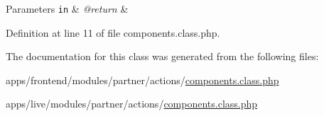 \begin{DoxyParams}[1]{Parameters}
\mbox{\tt in}  & {\em @return} & \\
\hline
\end{DoxyParams}


Definition at line 11 of file components.\-class.\-php.



The documentation for this class was generated from the following files\-:\begin{DoxyCompactItemize}
\item 
apps/frontend/modules/partner/actions/\hyperlink{frontend_2modules_2partner_2actions_2components_8class_8php}{components.\-class.\-php}\item 
apps/live/modules/partner/actions/\hyperlink{live_2modules_2partner_2actions_2components_8class_8php}{components.\-class.\-php}\end{DoxyCompactItemize}
